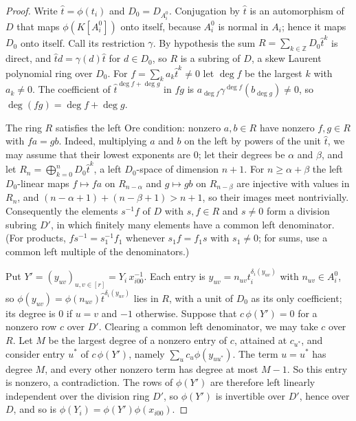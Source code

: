 \documentclass[11pt]{article}
\theoremstyle{definition}
\theoremstyle{remark}
\numberwithin{equation}{section}
\newcommand{\Z}{\mathbb Z}
\begin{document}
\begin{proof}
Write $\hat t=\phi(t_i)$ and $D_0=D_{A_i^0}$. Conjugation by $\hat t$ is an automorphism of $D$ that maps $\phi(K[A_i^0])$ onto itself, because $A_i^0$ is normal in $A_i$; hence it maps $D_0$ onto itself. Call its restriction $\gamma$. By hypothesis the sum $R=\sum_{k\in\Z}D_0\hat t^k$ is direct, and $\hat td=\gamma(d)\hat t$ for $d\in D_0$, so $R$ is a subring of $D$, a skew Laurent polynomial ring over $D_0$. For $f=\sum_ka_k\hat t^k\ne0$ let $\deg f$ be the largest $k$ with $a_k\ne0$. The coefficient of $\hat t^{\deg f+\deg g}$ in $fg$ is $a_{\deg f}\gamma^{\deg f}(b_{\deg g})\ne0$, so $\deg(fg)=\deg f+\deg g$.

The ring $R$ satisfies the left Ore condition: nonzero $a,b\in R$ have nonzero $f,g\in R$ with $fa=gb$. Indeed, multiplying $a$ and $b$ on the left by powers of the unit $\hat t$, we may assume that their lowest exponents are $0$; let their degrees be $\alpha$ and $\beta$, and let $R_n=\bigoplus_{k=0}^nD_0\hat t^k$, a left $D_0$-space of dimension $n+1$. For $n\ge\alpha+\beta$ the left $D_0$-linear maps $f\mapsto fa$ on $R_{n-\alpha}$ and $g\mapsto gb$ on $R_{n-\beta}$ are injective with values in $R_n$, and $(n-\alpha+1)+(n-\beta+1)>n+1$, so their images meet nontrivially. Consequently the elements $s^{-1}f$ of $D$ with $s,f\in R$ and $s\ne0$ form a division subring $D'$, in which finitely many elements have a common left denominator. (For products, $fs^{-1}=s_1^{-1}f_1$ whenever $s_1f=f_1s$ with $s_1\ne0$; for sums, use a common left multiple of the denominators.)

Put $Y'=(y_{uv})_{u,v\in[r]}=Y_i\,x_{i00}^{-1}$. Each entry is $y_{uv}=n_{uv}t_i^{\delta_i(y_{uv})}$ with $n_{uv}\in A_i^0$, so $\phi(y_{uv})=\phi(n_{uv})\hat t^{\delta_i(y_{uv})}$ lies in $R$, with a unit of $D_0$ as its only coefficient; its degree is $0$ if $u=v$ and $-1$ otherwise. Suppose that $c\,\phi(Y')=0$ for a nonzero row $c$ over $D'$. Clearing a common left denominator, we may take $c$ over $R$. Let $M$ be the largest degree of a nonzero entry of $c$, attained at $c_{u^*}$, and consider entry $u^*$ of $c\,\phi(Y')$, namely $\sum_uc_u\phi(y_{uu^*})$. The term $u=u^*$ has degree $M$, and every other nonzero term has degree at most $M-1$. So this entry is nonzero, a contradiction. The rows of $\phi(Y')$ are therefore left linearly independent over the division ring $D'$, so $\phi(Y')$ is invertible over $D'$, hence over $D$, and so is $\phi(Y_i)=\phi(Y')\phi(x_{i00})$.
\end{proof}
\end{document}
